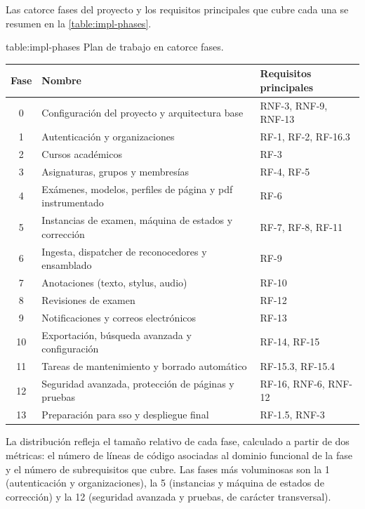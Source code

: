 Las catorce fases del proyecto y los requisitos principales que cubre
cada una se resumen en la \cref{table:impl-phases}. %

\begin{table}[Fases del proyecto]%
            {table:impl-phases}%
            {Plan de trabajo en catorce fases.}
  \small
  \renewcommand{\arraystretch}{1.3}
  \begin{tabular}{c p{7cm} p{4cm}}
    \hline
    \textbf{Fase} & \textbf{Nombre} & \textbf{Requisitos principales} \\
    \hline
    0  & Configuración del proyecto y arquitectura base
       & RNF-3, RNF-9, RNF-13 \\
    1  & Autenticación y organizaciones
       & RF-1, RF-2, RF-16.3 \\
    2  & Cursos académicos
       & RF-3 \\
    3  & Asignaturas, grupos y membresías
       & RF-4, RF-5 \\
    4  & Exámenes, modelos, perfiles de página y \acs{pdf} instrumentado
       & RF-6 \\
    5  & Instancias de examen, máquina de estados y corrección
       & RF-7, RF-8, RF-11 \\
    6  & Ingesta, dispatcher de reconocedores y ensamblado
       & RF-9 \\
    7  & Anotaciones (texto, stylus, audio)
       & RF-10 \\
    8  & Revisiones de examen
       & RF-12 \\
    9  & Notificaciones y correos electrónicos
       & RF-13 \\
    10 & Exportación, búsqueda avanzada y configuración
       & RF-14, RF-15 \\
    11 & Tareas de mantenimiento y borrado automático
       & RF-15.3, RF-15.4 \\
    12 & Seguridad avanzada, protección de páginas y pruebas
       & RF-16, RNF-6, RNF-12 \\
    13 & Preparación para \acs{sso} y despliegue final
       & RF-1.5, RNF-3 \\
    \hline
  \end{tabular}
\end{table}

La distribución refleja el tamaño relativo de cada fase, calculado a
partir de dos métricas: el número de líneas de código asociadas al
dominio funcional de la fase y el número de subrequisitos que cubre. Las
fases más voluminosas son la 1 (autenticación y organizaciones), la 5
(instancias y máquina de estados de corrección) y la 12 (seguridad
avanzada y pruebas, de carácter transversal).
